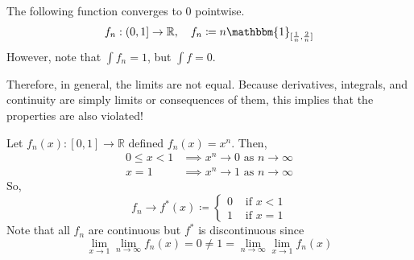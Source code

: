   \begin{example}
    \label{ex:escape-to-vertical-infinity}
    The following function converges to $0$ pointwise. 
    \begin{equation}
      f_n: (0, 1] \to \mathbb{R}, \quad f_n \coloneqq n \mathbbm{1}_{[\frac{1}{n}, \frac{2}{n}]} 
    \end{equation}
    However, note that $\int f_n = 1$, but $\int f = 0$. 

    \begin{center}
    \end{center}
  \end{example}

  Therefore, in general, the limits are not equal. Because derivatives, integrals, and continuity are simply limits or consequences of them, this implies that the properties are also violated!

  \begin{example}
    \label{ex:pointwise-limit-of-continuous-functions-is-not}
    Let $f_n (x) : [0, 1] \to \mathbb{R}$  defined $f_n (x) = x^n$. Then, 
    \begin{align}
      0 \leq x < 1 & \implies x^n \to 0 \text{ as } n \to \infty \\ 
      x = 1 & \implies x^n \to 1 \text{ as } n \to \infty
    \end{align}
    So, 
    \begin{equation}
      f_n \to f^\ast (x) \coloneqq \begin{cases} 
        0 & \text{ if } x < 1 \\ 
        1 & \text{ if } x = 1
      \end{cases}
    \end{equation}
    Note that all $f_n$ are continuous but $f^\ast$ is discontinuous since 
    \begin{equation}
      \lim_{x \to 1} \lim_{n \to \infty} f_n (x) = 0 \neq 1 = \lim_{n \to \infty} \lim_{x \to 1} f_n (x)
    \end{equation}
  \end{example}

